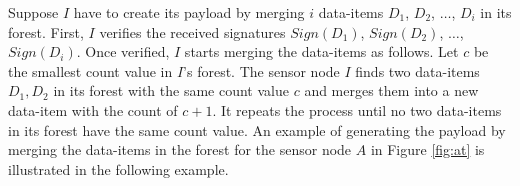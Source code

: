 	Suppose $I$ have to create its payload by merging $i$ data-items $D_{1}$, $D_{2}$, $\dotsc$, $D_{i}$ in its forest.
	First, $I$ verifies the received signatures $Sign(D_{1})$, $Sign(D_{2})$, $\dotsc$, $Sign(D_{i})$.
	Once verified, $I$ starts merging the data-items as follows.
	Let $c$ be the smallest count value in $I$'s forest.
	The sensor node $I$ finds two data-items $D_{1},D_{2}$ in its forest with the same count value $c$ and merges them into a new data-item with the count of $c+1$.
	It repeats the process until no two data-items in its forest have the same count value.
	An example of generating the payload by merging the data-items in the forest for the sensor node $A$ in Figure \ref{fig:at} is illustrated in the following example.
